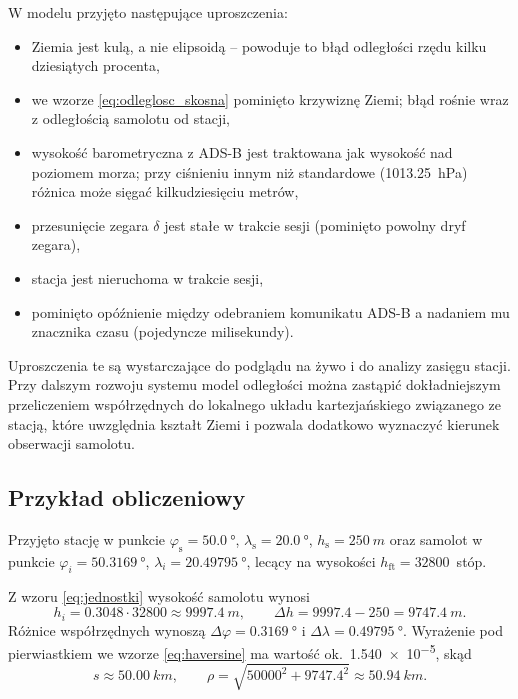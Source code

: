 W modelu przyjęto następujące uproszczenia:
\begin{itemize}[nosep]
  \item Ziemia jest kulą, a nie elipsoidą -- powoduje to błąd odległości
        rzędu kilku dziesiątych procenta,
  \item we wzorze \eqref{eq:odleglosc_skosna} pominięto krzywiznę Ziemi;
        błąd rośnie wraz z odległością samolotu od stacji,
  \item wysokość barometryczna z ADS-B jest traktowana jak wysokość nad
        poziomem morza; przy ciśnieniu innym niż standardowe
        (\SI{1013.25}{hPa}) różnica może sięgać kilkudziesięciu metrów,
  \item przesunięcie zegara $\delta$ jest stałe w trakcie sesji (pominięto
        powolny dryf zegara),
  \item stacja jest nieruchoma w trakcie sesji,
  \item pominięto opóźnienie między odebraniem komunikatu ADS-B a nadaniem mu
        znacznika czasu (pojedyncze milisekundy).
\end{itemize}
Uproszczenia te są wystarczające do podglądu na żywo i do analizy zasięgu
stacji. Przy dalszym rozwoju systemu model odległości można zastąpić
dokładniejszym przeliczeniem współrzędnych do lokalnego układu kartezjańskiego
związanego ze stacją, które uwzględnia kształt Ziemi i pozwala dodatkowo
wyznaczyć kierunek obserwacji samolotu.

\subsection{Przykład obliczeniowy}
\label{sec:model_przyklad}

Przyjęto stację w punkcie $\varphi_{\mathrm{s}} = \SI{50.0}{\degree}$,
$\lambda_{\mathrm{s}} = \SI{20.0}{\degree}$, $h_{\mathrm{s}} = \SI{250}{m}$
oraz samolot w punkcie $\varphi_i = \SI{50.3169}{\degree}$,
$\lambda_i = \SI{20.49795}{\degree}$, lecący na wysokości
$h_{\mathrm{ft}} = \num{32800}$~stóp.

Z wzoru \eqref{eq:jednostki} wysokość samolotu wynosi
\begin{equation}
  h_i = \num{0.3048} \cdot \num{32800} \approx \SI{9997.4}{m},
  \qquad
  \Delta h = \num{9997.4} - 250 = \SI{9747.4}{m}.
\end{equation}
Różnice współrzędnych wynoszą $\Delta\varphi = \SI{0.3169}{\degree}$
i $\Delta\lambda = \SI{0.49795}{\degree}$. Wyrażenie pod pierwiastkiem we
wzorze \eqref{eq:haversine} ma wartość ok.\ \num{1.540e-5}, skąd
\begin{equation}
  s \approx \SI{50.00}{km}, \qquad
  \rho = \sqrt{\num{50000}^2 + \num{9747.4}^2} \approx \SI{50.94}{km}.
\end{equation}

